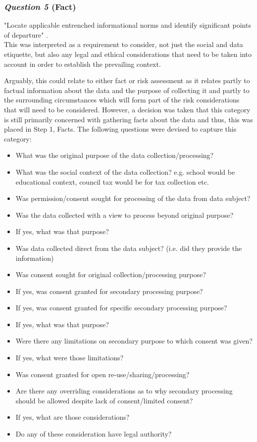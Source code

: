 \subsubsection {{\it Question 5} {\bf(Fact)}}
"Locate applicable entrenched informational norms and identify significant points of departure" \cite{Nissenbaum_2010}.\\

This was interpreted as a requirement to consider, not just the social and data etiquette, but also any legal and ethical considerations that need to be taken into account in order to establish the prevailing context. 

Arguably, this could relate to either fact or risk assessment as it relates partly to factual information about the data and the purpose of collecting it and partly to the surrounding circumstances which will form part of the risk considerations that will need to be considered. However, a decision was taken that this category is still primarily concerned with gathering facts about the data and thus, this was placed in Step 1, Facts. The following questions were devised to capture this category:
\begin{itemize}
\item What was the original purpose of the data collection/processing?
\item What was the social context of the data collection? e.g. school would be educational context, council tax would be for tax collection etc.
\item Was permission/consent sought for processing of the data from data subject?
\item Was the data collected with a view to process beyond original purpose?
\item If yes, what was that purpose?
\item Was data collected direct from the data subject? (i.e. did they provide the information)
\item Was consent sought for original collection/processing purpose?
\item If yes, was consent granted for secondary processing purpose? 
\item If yes, was consent granted for specific secondary processing purpose? 
\item If yes, what was that purpose?
\item Were there any limitations on secondary purpose to which consent was given? 
\item If yes, what were those limitations?
\item Was consent granted for open re-use/sharing/processing?
\item Are there any overriding considerations as to why secondary processing should be allowed despite lack of consent/limited consent?
\item If yes, what are those considerations? 
\item Do any of these consideration have legal authority? 
\end{itemize}
